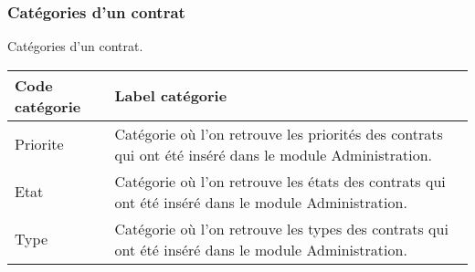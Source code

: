 \subsubsection{Catégories d'un contrat}

Catégories d'un contrat.\\

\begin{tabular}{|p{3cm}|p{10cm}|}
\hline\textbf{Code catégorie} & \textbf{Label catégorie} \\
\hline
Priorite & Catégorie où l'on retrouve les priorités des contrats qui ont été inséré dans le module Administration.\\
\hline
Etat & Catégorie où l'on retrouve les états des contrats qui ont été inséré dans le module Administration.\\
\hline
Type & Catégorie où l'on retrouve les types des contrats qui ont été inséré dans le module Administration.\\
\hline


\end{tabular}
